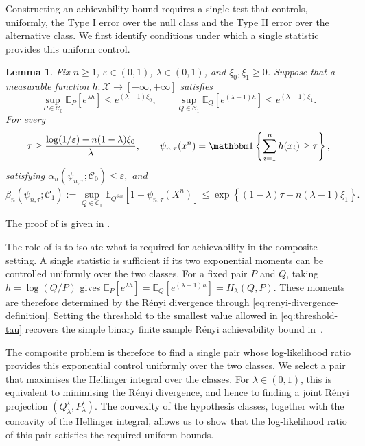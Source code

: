 \documentclass[journal,10pt,draftclsnofoot,onecolumn]{IEEEtran}
\newtheorem{lemma}{Lemma}
\begin{document}
Constructing an achievability bound requires a single test that controls, uniformly, the Type I error over the null class and the Type II error  over the alternative class. We first identify conditions under which a single statistic provides this uniform control.

\begin{lemma}
\label{lem:uniform-score-achievability}
Fix $n\geq1$, $\varepsilon\in(0,1)$, $\lambda\in(0,1)$, and $\xi_0,\xi_1\geq0$. Suppose that a measurable function
$h:\mathcal X\to[-\infty,+\infty]$ satisfies
\begin{equation*}
\sup_{P\in\mathcal C_0} \mathbb E_P\left[e^{\lambda h}\right] \leq e^{(\lambda-1)\xi_0}, \qquad \sup_{Q\in\mathcal C_1}\mathbb E_Q\left[e^{(\lambda-1)h}\right] \leq e^{(\lambda-1)\xi_1}.
\end{equation*}
For every
\begin{equation}
\tau \geq \frac{\log(1/\varepsilon)-n(1-\lambda)\xi_0}{\lambda},\qquad \psi_{n,\tau}(x^n)=\mathbbm 1 \left\{\sum_{i=1}^n h(x_i)\geq\tau\right\},
\label{eq:threshold-tau}
\end{equation}
satisfying $\alpha_n(\psi_{n,\tau};\mathcal C_0) \leq \varepsilon,$ and
\begin{equation*}
\beta_n(\psi_{n,\tau};\mathcal C_1):=\sup_{Q\in\mathcal C_1} \mathbb E_{Q^{\otimes n}} \left[ 1-\psi_{n,\tau}(X^n) \right] \leq \exp\left\{ (1-\lambda)\tau+n(\lambda-1)\xi_1 \right\}.
\end{equation*}
\end{lemma}
The proof of  is given in .

The role of  is to isolate what is required for achievability in the composite setting. A single statistic is sufficient if its two exponential moments can be controlled uniformly over the two classes. For a fixed pair $P$ and $Q$, taking $h=\log(Q/P)$ gives $\mathbb E_P[e^{\lambda h}] =\mathbb E_Q[e^{(\lambda-1)h}] =H_\lambda(Q,P)$. These moments are therefore determined by the R\'enyi divergence through \eqref{eq:renyi-divergence-definition}. Setting the threshold to the smallest value allowed in \eqref{eq:threshold-tau} recovers the simple binary finite sample R\'enyi achievability bound in~\cite[Thm.~2]{bruno2026finite}.

The composite problem is therefore to find a single pair whose log-likelihood ratio provides this exponential control uniformly over the two classes. We select a pair that maximises the Hellinger integral over the classes. For $\lambda\in(0,1)$, this is equivalent to minimising the R\'enyi divergence, and hence to finding a joint R\'enyi projection $(Q_\lambda^\star,P_\lambda^\star)$. The convexity of the hypothesis classes, together with the concavity of the Hellinger integral, allows us to show that the log-likelihood ratio of this pair satisfies the required uniform bounds.
\end{document}
